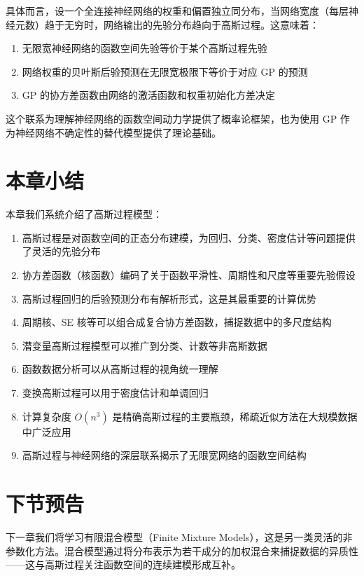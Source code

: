 具体而言，设一个全连接神经网络的权重和偏置独立同分布，当网络宽度（每层神经元数）趋于无穷时，网络输出的先验分布趋向于高斯过程。这意味着：

\begin{enumerate}
  \item 无限宽神经网络的函数空间先验等价于某个高斯过程先验
  \item 网络权重的贝叶斯后验预测在无限宽极限下等价于对应 GP 的预测
  \item GP 的协方差函数由网络的激活函数和权重初始化方差决定
\end{enumerate}

这个联系为理解神经网络的函数空间动力学提供了概率论框架，也为使用 GP 作为神经网络不确定性的替代模型提供了理论基础。

\section{本章小结}

本章我们系统介绍了高斯过程模型：

\begin{enumerate}
  \item 高斯过程是对函数空间的正态分布建模，为回归、分类、密度估计等问题提供了灵活的先验分布
  \item 协方差函数（核函数）编码了关于函数平滑性、周期性和尺度等重要先验假设
  \item 高斯过程回归的后验预测分布有解析形式，这是其最重要的计算优势
  \item 周期核、SE 核等可以组合成复合协方差函数，捕捉数据中的多尺度结构
  \item 潜变量高斯过程模型可以推广到分类、计数等非高斯数据
  \item 函数数据分析可以从高斯过程的视角统一理解
  \item 变换高斯过程可以用于密度估计和单调回归
  \item 计算复杂度 $O(n^3)$ 是精确高斯过程的主要瓶颈，稀疏近似方法在大规模数据中广泛应用
  \item 高斯过程与神经网络的深层联系揭示了无限宽网络的函数空间结构
\end{enumerate}

\section{下节预告}

下一章我们将学习有限混合模型（Finite Mixture Models），这是另一类灵活的非参数化方法。混合模型通过将分布表示为若干成分的加权混合来捕捉数据的异质性——这与高斯过程关注函数空间的连续建模形成互补。

